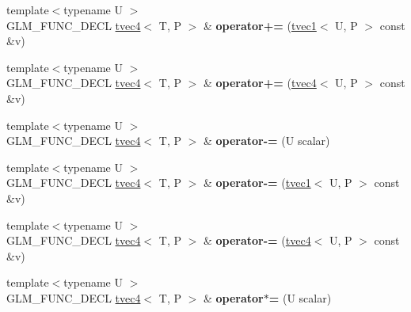 \begin{DoxyCompactItemize}
\item 
\mbox{\label{structglm_1_1tvec4_a0bb5ea385459a6ce515301cc4ee02368}} 
{\footnotesize template$<$typename U $>$ }\\G\+L\+M\+\_\+\+F\+U\+N\+C\+\_\+\+D\+E\+CL \hyperlink{structglm_1_1tvec4}{tvec4}$<$ T, P $>$ \& {\bfseries operator+=} (\hyperlink{structglm_1_1tvec1}{tvec1}$<$ U, P $>$ const \&v)
\item 
\mbox{\label{structglm_1_1tvec4_a640fd04b14ab0540880eb905da18351a}} 
{\footnotesize template$<$typename U $>$ }\\G\+L\+M\+\_\+\+F\+U\+N\+C\+\_\+\+D\+E\+CL \hyperlink{structglm_1_1tvec4}{tvec4}$<$ T, P $>$ \& {\bfseries operator+=} (\hyperlink{structglm_1_1tvec4}{tvec4}$<$ U, P $>$ const \&v)
\item 
\mbox{\label{structglm_1_1tvec4_af782f3e86c5590d64f950a389329a39a}} 
{\footnotesize template$<$typename U $>$ }\\G\+L\+M\+\_\+\+F\+U\+N\+C\+\_\+\+D\+E\+CL \hyperlink{structglm_1_1tvec4}{tvec4}$<$ T, P $>$ \& {\bfseries operator-\/=} (U scalar)
\item 
\mbox{\label{structglm_1_1tvec4_ac24de9d6acf744c2096912edc4df028b}} 
{\footnotesize template$<$typename U $>$ }\\G\+L\+M\+\_\+\+F\+U\+N\+C\+\_\+\+D\+E\+CL \hyperlink{structglm_1_1tvec4}{tvec4}$<$ T, P $>$ \& {\bfseries operator-\/=} (\hyperlink{structglm_1_1tvec1}{tvec1}$<$ U, P $>$ const \&v)
\item 
\mbox{\label{structglm_1_1tvec4_afe14eb392701467a495123d8163827eb}} 
{\footnotesize template$<$typename U $>$ }\\G\+L\+M\+\_\+\+F\+U\+N\+C\+\_\+\+D\+E\+CL \hyperlink{structglm_1_1tvec4}{tvec4}$<$ T, P $>$ \& {\bfseries operator-\/=} (\hyperlink{structglm_1_1tvec4}{tvec4}$<$ U, P $>$ const \&v)
\item 
\mbox{\label{structglm_1_1tvec4_a47a71969dd36394620eb95af9ad63554}} 
{\footnotesize template$<$typename U $>$ }\\G\+L\+M\+\_\+\+F\+U\+N\+C\+\_\+\+D\+E\+CL \hyperlink{structglm_1_1tvec4}{tvec4}$<$ T, P $>$ \& {\bfseries operator$\ast$=} (U scalar)
\item 

\end{DoxyCompactItemize}
